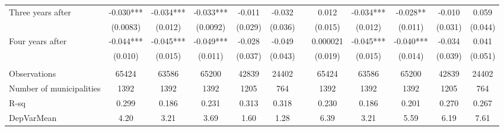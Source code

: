 \begin{tabular}{lccccccccccc}
Three years after & -0.030*** & -0.034*** & -0.033*** & -0.011 & -0.032 &       & 0.012 & -0.034*** & -0.028** & -0.010 & 0.059 \\
      & (0.0083) & (0.012) & (0.0092) & (0.029) & (0.036) &       & (0.015) & (0.012) & (0.011) & (0.031) & (0.044) \\
Four years after & -0.044*** & -0.045*** & -0.049*** & -0.028 & -0.049 &       & 0.000021 & -0.045*** & -0.040*** & -0.034 & 0.041 \\
      & (0.010) & (0.015) & (0.011) & (0.037) & (0.043) &       & (0.019) & (0.015) & (0.014) & (0.039) & (0.051) \\
      &       &       &       &       &       &       &       &       &       &       &  \\
\midrule
Observations & 65424 & 63586 & 65200 & 42839 & 24402 &       & 65424 & 63586 & 65200 & 42839 & 24402 \\
Number of municipalities & 1392  & 1392  & 1392  & 1205  & 764   &       & 1392  & 1392  & 1392  & 1205  & 764 \\
R-sq  & 0.299 & 0.186 & 0.231 & 0.313 & 0.318 &       & 0.230 & 0.186 & 0.201 & 0.270 & 0.267 \\
DepVarMean & 4.20  & 3.21  & 3.69  & 1.60  & 1.28  &       & 6.39  & 3.21  & 5.59  & 6.19  & 7.61 \\
\bottomrule
\bottomrule
\end{tabular}%
